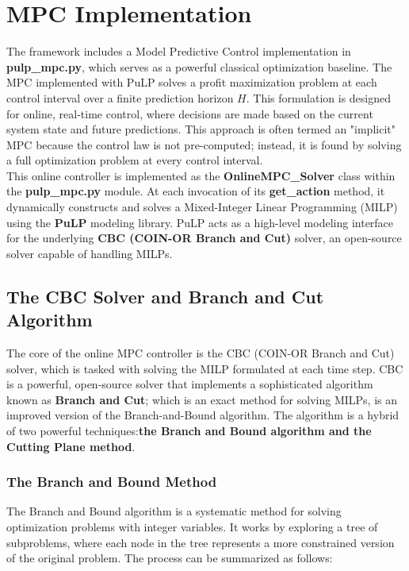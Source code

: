 
\section{MPC Implementation}
The framework includes a Model Predictive Control implementation in \textbf{pulp\_mpc.py}, which serves as a powerful classical optimization baseline.
The MPC implemented with PuLP solves a profit maximization problem at each control interval over a finite prediction horizon $H$. This formulation is designed for online, real-time control, where decisions are made based on the current system state and future predictions. This approach is often termed an "implicit" MPC because the control law is not pre-computed; instead, it is found by solving a full optimization problem at every control interval.
\\
\noindent
This online controller is implemented as the \textbf{OnlineMPC\_Solver} class within the \textbf{pulp\_mpc.py} module. At each invocation of its \textbf{get\_action} method, it dynamically constructs and solves a Mixed-Integer Linear Programming (MILP) using the \textbf{PuLP} modeling library. PuLP acts as a high-level modeling interface for the underlying \textbf{CBC (COIN-OR Branch and Cut)} solver, an open-source solver capable of handling MILPs.


\subsection{The CBC Solver and Branch and Cut Algorithm}
\label{sec:cbc_branch_cut}

The core of the online MPC controller is the CBC (COIN-OR Branch and Cut) solver, which is tasked with solving the MILP formulated at each time step. CBC is a powerful, open-source solver that implements a sophisticated algorithm known as \textbf{Branch and Cut}; which is an exact method for solving MILPs, is an improved version of the Branch-and-Bound
algorithm. The algorithm is a hybrid of two powerful techniques:\textbf{the Branch and Bound algorithm and the Cutting Plane method}.

\subsubsection{The Branch and Bound Method}
The Branch and Bound algorithm is a systematic method for solving optimization problems with integer variables. It works by exploring a tree of subproblems, where each node in the tree represents a more constrained version of the original problem. The process can be summarized as follows:

